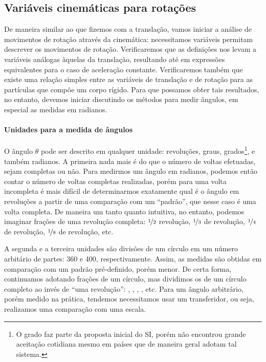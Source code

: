 \subsection{Variáveis cinemáticas para rotações}

De maneira similar ao que fizemos com a translação, vamos iniciar a análise de movimentos de rotação através da cinemática: necessitamos variáveis permitam descrever os movimentos de rotação. Verificaremos que as definições nos levam a variáveis análogas àquelas da translação, resultando até em expressões equivalentes para o caso de aceleração constante. Verificaremos também que existe uma relação simples entre as variáveis de translação e de rotação para as partículas que compõe um corpo rígido. Para que possamos obter tais resultados, no entanto, devemos iniciar discutindo os métodos para medir ângulos, em especial as medidas em radianos. 

\paragraph{Unidades para a medida de ângulos}

O ângulo $\theta$ pode ser descrito em qualquer unidade: revoluções, graus, grados\footnote{O grado faz parte da proposta inicial do SI, porém não encontrou grande aceitação cotidiana mesmo em países que de maneira geral adotam tal sistema.}, e também radianos. A primeira nada mais é do que o número de voltas efetuadas, sejam completas ou não. Para medirmos um ângulo em radianos, podemos então contar o número de voltas completas realizadas, porém para uma volta incompleta é mais difícil de determinarmos exatamente qual é o ângulo em revoluções a partir de uma comparação com um ``padrão'', que nesse caso é uma volta completa. De maneira um tanto quanto intuitiva, no entanto, podemos imaginar frações de uma revolução completa: $\nicefrac{1}{2}$ revolução, $\nicefrac{1}{3}$ de revolução, $\nicefrac{1}{4}$ de revolução, $\nicefrac{1}{8}$ de revolução, etc. 

A segunda e a terceira unidades são divisões de um círculo em um número arbitário de partes: 360 e 400, respectivamente. Assim, as medidas são obtidas em comparação com um padrão pré-definido, porém menor. De certa forma, continuamos adotando frações de um círculo, mas dividimos os  de um círculo completo ao invés de ``uma revolução'': , , , , etc. Para um ângulo arbitrário, porém medido na prática, tendemos necessitamos usar um transferidor, ou seja, realizamos uma comparação com uma escala.

